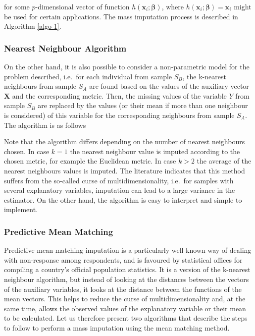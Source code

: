 \documentclass[
]{jss}
\begin{document}
for some \(p\)-dimensional vector of function
\(h\left(\boldsymbol{x}_i ; \boldsymbol{\beta}\right)\), where
\(h\left(\boldsymbol{x}_i ; \boldsymbol{\beta}\right) = \boldsymbol{x}_i\)
might be used for certain applications. The mass imputation process is
described in Algorithm \ref{algo-1}.

\subsubsection{Nearest Neighbour
Algorithm}\label{nearest-neighbour-algorithm}

On the other hand, it is also possible to consider a non-parametric
model for the problem described, i.e.~for each individual from sample
\(S_B\), the k-nearest neighbours from sample \(S_A\) are found based on
the values of the auxiliary vector \(\boldsymbol{X}\) and the
corresponding metric. Then, the missing values of the variable \(Y\)
from sample \(S_B\) are replaced by the values (or their mean if more
than one neighbour is considered) of this variable for the corresponding
neighbours from sample \(S_A\). The algorithm is as follows

Note that the algorithm differs depending on the number of nearest
neighbours chosen. In case \(k=1\) the nearest neighbour value is
imputed according to the chosen metric, for example the Euclidean
metric. In case \(k>2\) the average of the nearest neighbours values is
imputed. The literature indicates that this method suffers from the
so-called curse of multidimensionality, i.e.~for samples with several
explanatory variables, imputation can lead to a large variance in the
estimator. On the other hand, the algorithm is easy to interpret and
simple to implement.

\subsubsection{Predictive Mean Matching}\label{predictive-mean-matching}

Predictive mean-matching imputation is a particularly well-known way of
dealing with non-response among respondents, and is favoured by
statistical offices for compiling a country's official population
statistics. It is a version of the k-nearest neighbour algorithm, but
instead of looking at the distances between the vectors of the auxiliary
variables, it looks at the distance between the functions of the mean
vectors. This helps to reduce the curse of multidimensionality and, at
the same time, allows the observed values of the explanatory variable or
their mean to be calculated. Let us therefore present two algorithms
that describe the steps to follow to perform a mass imputation using the
mean matching method.
\end{document}
